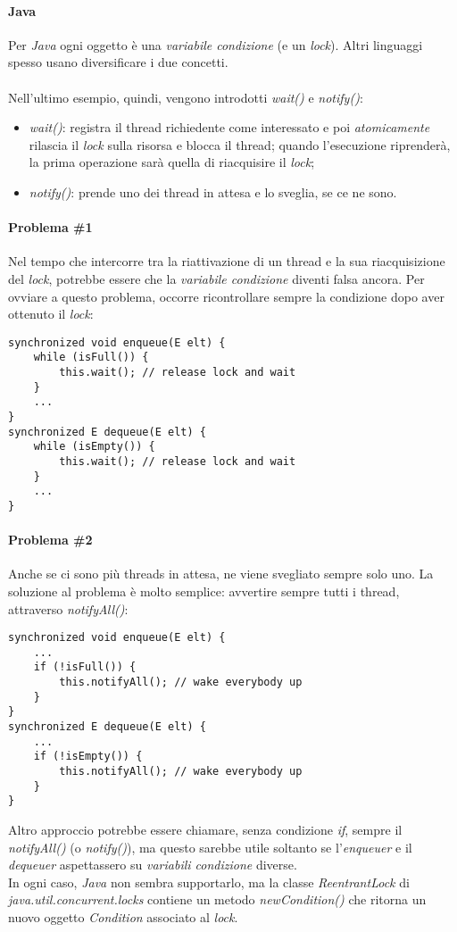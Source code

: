 \paragraph{Java}
Per \textit{Java} ogni oggetto è una \textit{variabile condizione} (e un \textit{lock}). Altri linguaggi spesso usano diversificare i due concetti. \\\\

Nell'ultimo esempio, quindi, vengono introdotti \textit{wait()} e \textit{notify()}:
\begin{itemize}
	\item \textit{wait()}: registra il thread richiedente come interessato e poi \textit{atomicamente} rilascia il \textit{lock} sulla risorsa e blocca il thread; quando l'esecuzione riprenderà, la prima operazione sarà quella di riacquisire il \textit{lock};
	\item \textit{notify()}: prende uno dei thread in attesa e lo sveglia, se ce ne sono.
\end{itemize}

\paragraph{Problema \#1}
Nel tempo che intercorre tra la riattivazione di un thread e la sua riacquisizione del \textit{lock}, potrebbe essere che la \textit{variabile condizione} diventi falsa ancora. Per ovviare a questo problema, occorre ricontrollare sempre la condizione dopo aver ottenuto il \textit{lock}:
\begin{lstlisting}
synchronized void enqueue(E elt) {
	while (isFull()) {
		this.wait(); // release lock and wait
	}
	...
}
synchronized E dequeue(E elt) {
	while (isEmpty()) {
		this.wait(); // release lock and wait
	}
	...
}
\end{lstlisting}

\paragraph{Problema \#2}
Anche se ci sono più threads in attesa, ne viene svegliato sempre solo uno. La soluzione al problema è molto semplice: avvertire sempre tutti i thread, attraverso \textit{notifyAll()}:
\begin{lstlisting}
synchronized void enqueue(E elt) {
	...
	if (!isFull()) {
		this.notifyAll(); // wake everybody up
	}
}
synchronized E dequeue(E elt) {
	...
	if (!isEmpty()) {
		this.notifyAll(); // wake everybody up
	}
}
\end{lstlisting}
Altro approccio potrebbe essere chiamare, senza condizione \textit{if}, sempre il \textit{notifyAll()} (o \textit{notify()}), ma questo sarebbe utile soltanto se l'\textit{enqueuer} e il \textit{dequeuer} aspettassero su \textit{variabili condizione} diverse. \\
In ogni caso, \textit{Java} non sembra supportarlo, ma la classe \textit{ReentrantLock} di \textit{java.util.concurrent.locks} contiene un metodo \textit{newCondition()} che ritorna un nuovo oggetto \textit{Condition} associato al \textit{lock}.

